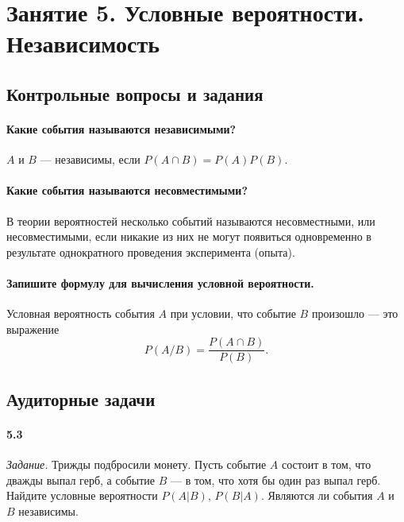 \chapter*{Занятие 5. Условные вероятности. Независимость}

\section*{Контрольные вопросы и задания}

\subsubsection*{Какие события называются независимыми?}

$A$ и $B$ --- независимы, если $P \left( A \cap B \right) = P \left( A \right) P \left( B \right) $.

\subsubsection*{Какие события называются несовместимыми?}

В теории вероятностей несколько событий называются несовместными, или несовместимыми, если никакие из них не могут появиться одновременно в результате однократного проведения эксперимента (опыта).

\subsubsection*{Запишите формулу для вычисления условной вероятности.}

Условная вероятность события $A$ при условии, что событие $B$ произошло --- это выражение
$$P \left( A/B \right) =
\frac{P \left( A \cap B \right) }{P \left( B \right) }.$$

\section*{Аудиторные задачи}

\subsubsection*{5.3}

\textit{Задание.} Трижды подбросили монету.
Пусть событие $A$ состоит в том, что дважды выпал герб, а событие $B$ --- в том, что хотя бы один раз выпал герб.
Найдите условные вероятности $P \left( \left. A \right| B \right), \, P \left( \left. B \right| A \right) $.
Являются ли события $A$ и $B$ независимы.

